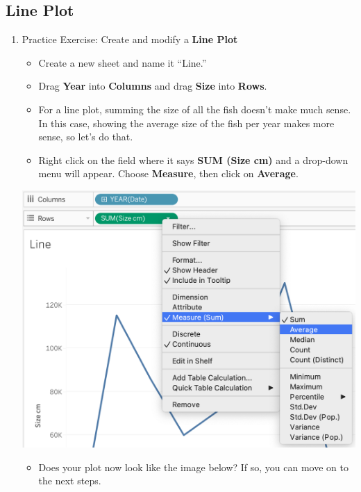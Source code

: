 \documentclass[
]{book}
\providecommand{\tightlist}{%
  \setlength{\itemsep}{0pt}\setlength{\parskip}{0pt}}
\begin{document}
\hypertarget{line-plot}{%
\subsection{Line Plot}\label{line-plot}}

\begin{enumerate}
\def\labelenumi{\arabic{enumi}.}
\item
  Practice Exercise: Create and modify a \textbf{Line Plot}

  \begin{itemize}
  \tightlist
  \item
    Create a new sheet and name it ``Line.''
  \item
    Drag \textbf{Year} into \textbf{Columns} and drag \textbf{Size} into \textbf{Rows}.
  \item
    For a line plot, summing the size of all the fish doesn't make much sense. In this case, showing the average size of the fish per year makes more sense, so let's do that.
  \item
    Right click on the field where it says \textbf{SUM (Size cm)} and a drop-down menu will appear. Choose \textbf{Measure}, then click on \textbf{Average}.
  \end{itemize}

  \includegraphics{images/M3S2_change-measure.png}

  \begin{itemize}
  \tightlist
  \item
    Does your plot now look like the image below? If so, you can move on to the next steps.
  \end{itemize}
\end{enumerate}
\end{document}
